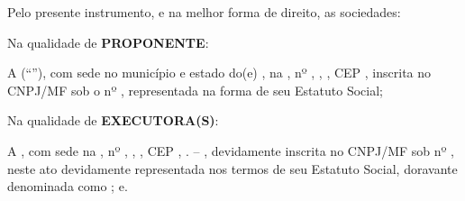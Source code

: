%
%




\pagestyle{plain} %



Pelo presente instrumento, e na melhor forma de direito, as sociedades:

Na qualidade de \textbf{PROPONENTE}: 

A \textbf{\NomeContratante} (“\textbf{\NomeContratanteResumido}”), com sede no município \CidadeEnderecoContratante e estado do(e) \EstadoEnderecoContratante, na \EnderecoContratante, nº \numeroEnderecoContratante, \ComplementoEnderecoContratante, \BairroContratante, CEP \CEPContratante, inscrita no CNPJ/MF sob o nº \NumCNPJContratante, representada na forma de seu Estatuto Social;

Na qualidade de \textbf{EXECUTORA(S)}:	

A \textbf{\NomeExecutoraA}, com sede na \EnderecoExecutoraA, nº \numeroEnderecoExecutoraA, \ComplementoEnderecoExecutoraA, \BairroExecutoraA, CEP \CEPExecutoraA, \CidadeEnderecoExecutoraA. – \EstadoEnderecoExecutoraA, devidamente inscrita no CNPJ/MF sob nº \NumCNPJExecutoraA, neste ato devidamente representada nos termos de seu Estatuto Social, doravante denominada como  \textbf{\NomeExecutoraAResumido}; e.

